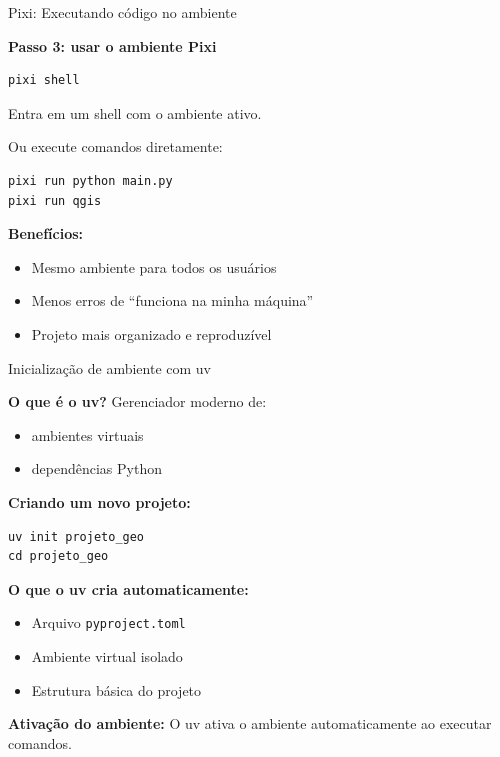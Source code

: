 \documentclass{beamer}
\begin{document}
\begin{frame}[fragile]{Pixi: Executando código no ambiente}
    
    \textbf{Passo 3: usar o ambiente Pixi}
    
    \begin{verbatim}
pixi shell
    \end{verbatim}
    
    Entra em um shell com o ambiente ativo.
    
    \vspace{0.3cm}
    
    Ou execute comandos diretamente:
    
    \begin{verbatim}
pixi run python main.py
pixi run qgis
    \end{verbatim}
    
    \vspace{0.3cm}
    
    \textbf{Benefícios:}
    \begin{itemize}
        \item Mesmo ambiente para todos os usuários
        \item Menos erros de “funciona na minha máquina”
        \item Projeto mais organizado e reproduzível
    \end{itemize}
\end{frame}

\begin{frame}[fragile]{Inicialização de ambiente com uv}

    \textbf{O que é o uv?}
    Gerenciador moderno de:
    \begin{itemize}
        \item ambientes virtuais
        \item dependências Python
    \end{itemize}
    
    \vspace{0.3cm}
    
    \textbf{Criando um novo projeto:}
    
    \begin{verbatim}
uv init projeto_geo
cd projeto_geo
    \end{verbatim}
    
    \vspace{0.3cm}
    
    \textbf{O que o uv cria automaticamente:}
    \begin{itemize}
        \item Arquivo \texttt{pyproject.toml}
        \item Ambiente virtual isolado
        \item Estrutura básica do projeto
    \end{itemize}
    
    \vspace{0.3cm}
    
    \textbf{Ativação do ambiente:}  
    O uv ativa o ambiente automaticamente ao executar comandos.
    
\end{frame}
\end{document}
